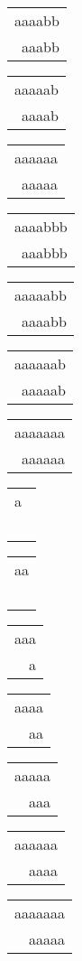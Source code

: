 \begin{tabular}{|l|} \hline
aaaabb \\
\ aaabb \\
\hline
\end{tabular} 
\begin{tabular}{|l|} \hline
aaaaab \\
\ aaaab \\
\hline
\end{tabular} 
\begin{tabular}{|l|} \hline
aaaaaa \\
\ aaaaa \\
\hline
\end{tabular} 
\begin{tabular}{|l|} \hline
aaaabbb \\
\ aaabbb \\
\hline
\end{tabular} 
\begin{tabular}{|l|} \hline
aaaaabb \\
\ aaaabb \\
\hline
\end{tabular} 
\begin{tabular}{|l|} \hline
aaaaaab \\
\ aaaaab \\
\hline
\end{tabular} 
\begin{tabular}{|l|} \hline
aaaaaaa \\
\ aaaaaa \\
\hline
\end{tabular} 
\begin{tabular}{|l|} \hline
a\  \\
\ \  \\
\hline
\end{tabular} 
\begin{tabular}{|l|} \hline
aa \\
\ \  \\
\hline
\end{tabular} 
\begin{tabular}{|l|} \hline
aaa \\
\ \ a \\
\hline
\end{tabular} 
\begin{tabular}{|l|} \hline
aaaa \\
\ \ aa \\
\hline
\end{tabular} 
\begin{tabular}{|l|} \hline
aaaaa \\
\ \ aaa \\
\hline
\end{tabular} 
\begin{tabular}{|l|} \hline
aaaaaa \\
\ \ aaaa \\
\hline
\end{tabular} 
\begin{tabular}{|l|} \hline
aaaaaaa \\
\ \ aaaaa \\
\hline
\end{tabular} 
